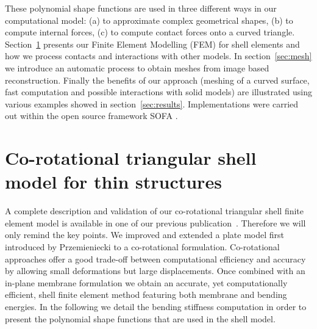\documentclass{llncs}
\begin{document}
These polynomial shape functions are used in three different ways in our computational model: (a) to approximate complex geometrical shapes, (b) to compute internal forces, (c) to compute contact forces onto a curved triangle. Section~\ref{sec:model} presents our Finite Element Modelling (FEM) for shell elements and how we process contacts and interactions with other models. In section~\ref{sec:mesh} we introduce an automatic process to obtain meshes from image based reconstruction. Finally the benefits of our approach (meshing of a curved surface, fast computation and possible interactions with solid models) are illustrated using various examples showed in section~\ref{sec:results}. Implementations were carried out within the open source framework SOFA \cite{SOFA}.

\section{Co-rotational triangular shell model for thin structures}
\label{sec:model}
%
A complete description and validation of our co-rotational triangular shell finite element model is available in one of our previous publication~\cite{Comas10}. 
Therefore we will only remind the key points. We improved and extended a plate model first introduced by Przemieniecki \cite{Przemieniecki68} to a co-rotational formulation. Co-rotational approaches offer a good trade-off between computational efficiency and accuracy by allowing small deformations but large displacements. Once combined with an in-plane membrane formulation we obtain an accurate, yet computationally efficient, shell finite element method featuring both membrane and bending energies. In the following we detail the bending stiffness computation in order to present the polynomial shape functions that are used in the shell model.
\end{document}
